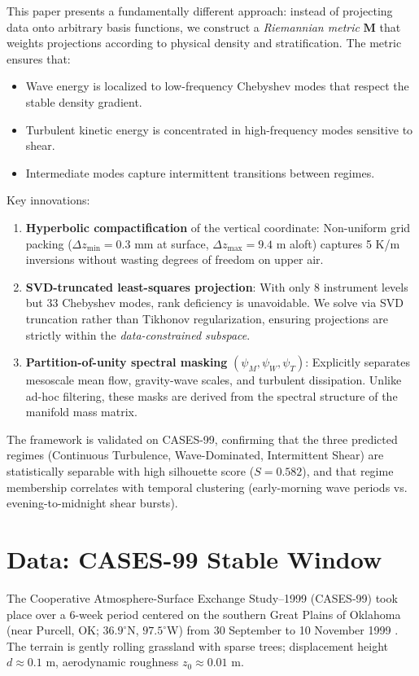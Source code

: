 \documentclass[11pt,a4paper]{article}
\begin{document}
This paper presents a fundamentally different approach: instead of projecting data onto arbitrary basis functions, we construct a \emph{Riemannian metric} $\mathbf{M}$ that weights projections according to physical density and stratification. The metric ensures that:
\begin{itemize}
  \item Wave energy is localized to low-frequency Chebyshev modes that respect the stable density gradient.
  \item Turbulent kinetic energy is concentrated in high-frequency modes sensitive to shear.
  \item Intermediate modes capture intermittent transitions between regimes.
\end{itemize}

Key innovations:
\begin{enumerate}
  \item \textbf{Hyperbolic compactification} of the vertical coordinate: Non-uniform grid packing ($\Delta z_{\min} = 0.3$ mm at surface, $\Delta z_{\max} = 9.4$ m aloft) captures 5 K/m inversions without wasting degrees of freedom on upper air.
  \item \textbf{SVD-truncated least-squares projection}: With only 8 instrument levels but 33 Chebyshev modes, rank deficiency is unavoidable. We solve via SVD truncation rather than Tikhonov regularization, ensuring projections are strictly within the \emph{data-constrained subspace}.
  \item \textbf{Partition-of-unity spectral masking} $(\psi_M, \psi_W, \psi_T)$: Explicitly separates mesoscale mean flow, gravity-wave scales, and turbulent dissipation. Unlike ad-hoc filtering, these masks are derived from the spectral structure of the manifold mass matrix.
\end{enumerate}

The framework is validated on CASES-99, confirming that the three predicted regimes (Continuous Turbulence, Wave-Dominated, Intermittent Shear) are statistically separable with high silhouette score ($S = 0.582$), and that regime membership correlates with temporal clustering (early-morning wave periods vs. evening-to-midnight shear bursts).

\section{Data: CASES-99 Stable Window}
\label{sec:data}

The Cooperative Atmosphere-Surface Exchange Study--1999 (CASES-99) took place over a 6-week period centered on the southern Great Plains of Oklahoma (near Purcell, OK; $36.9^\circ$N, $97.5^\circ$W) from 30 September to 10 November 1999 \citep{Poulos2002}. The terrain is gently rolling grassland with sparse trees; displacement height $d \approx 0.1$ m, aerodynamic roughness $z_0 \approx 0.01$ m.
\end{document}
